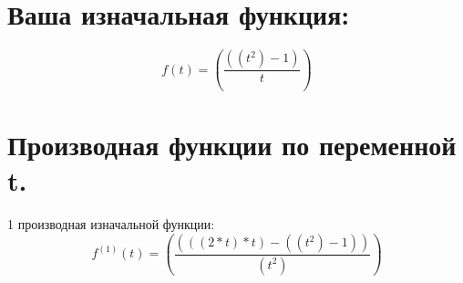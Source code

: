 \documentclass[12pt,a4paper]{scrartcl}
\begin{document}
\section{Ваша изначальная функция:} 
 \begin{equation} f(t) = {(\frac{({({t}^{2})}-{1})}{t})}\end{equation}
\section{Производная функции по переменной t.}1 производная изначальной функции:
 \begin{equation} f^{(1)}(t) = {(\frac{({({({2}*{t})}*{t})}-{({({t}^{2})}-{1})})}{({t}^{2})})}\end{equation}
\end{document}
